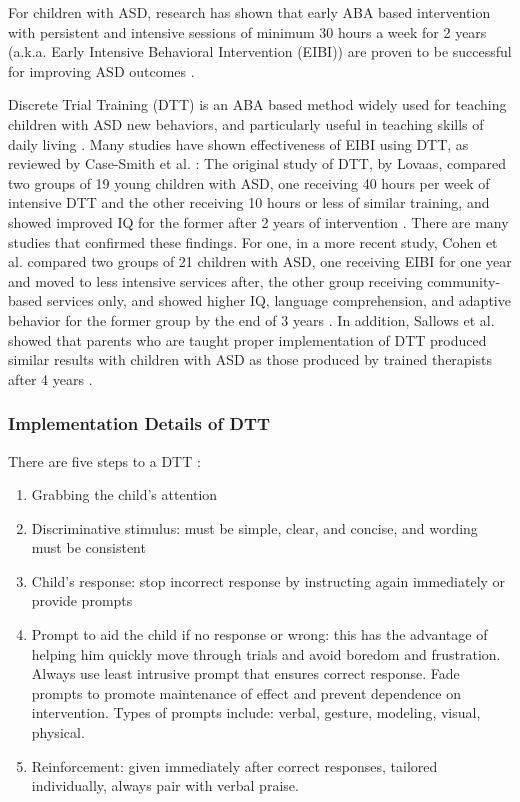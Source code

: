 \documentclass{ut-thesis}
\providecommand{\DIFaddtex}[1]{{\protect\color{blue}\uwave{#1}}} %
\providecommand{\DIFaddbegin}{} %
\providecommand{\DIFaddend}{} %
\providecommand{\DIFadd}[1]{\texorpdfstring{\DIFaddtex{#1}}{#1}} %
\begin{document}
For \DIFaddbegin \DIFadd{some }\DIFaddend children with ASD, research has shown that early ABA based intervention with persistent and intensive sessions of minimum 30 hours a week for 2 years (a.k.a. Early Intensive Behavioral Intervention (EIBI)) are proven to be successful for improving ASD outcomes \cite{howlin2009systematic}.

Discrete Trial Training (DTT) is an ABA based method widely used for teaching children with ASD new behaviors, and particularly useful in teaching skills of daily living \cite{smith2001discrete}.  Many studies have shown effectiveness of EIBI using DTT, as reviewed by Case-Smith et al. \cite{case2008evidence}: The original study of DTT, by Lovaas, compared two groups of 19 young children with ASD, one receiving 40 hours per week of intensive DTT and the other receiving 10 hours or less of similar training, and showed improved IQ for the former after 2 years of intervention \cite{lovaas1987behavioral}.  There are many studies that confirmed these findings.  For one, in a more recent study, Cohen et al. compared two groups of 21 children with ASD, one receiving EIBI for one year and moved to less intensive services after, the other group receiving community-based services only, and showed higher IQ, language comprehension, and adaptive behavior for the former group by the end of 3 years \cite{cohen2006early}.  In addition, Sallows et al. showed that parents who are taught proper implementation of DTT produced similar results with children with ASD as those produced by trained therapists after 4 years \cite{sallows2005intensive}.

\subsubsection{Implementation Details of DTT}
There are five steps to a DTT \cite{bogin2010steps}:
\begin{enumerate}
	\item Grabbing the child's attention
	\item Discriminative stimulus: must be simple, clear, and concise, and wording must be consistent
	\item Child's response: stop incorrect response by instructing again immediately or provide prompts
	\item Prompt to aid the child if no response or wrong: this has the advantage of helping him quickly move through trials and avoid boredom and frustration.  Always use least intrusive prompt that ensures correct response.  Fade prompts to promote maintenance of effect and prevent dependence on intervention.  Types of prompts include: verbal, gesture, modeling, visual, physical.
	\item Reinforcement: given immediately after correct responses, tailored individually, always pair with verbal praise.
\end{enumerate}
\end{document}
